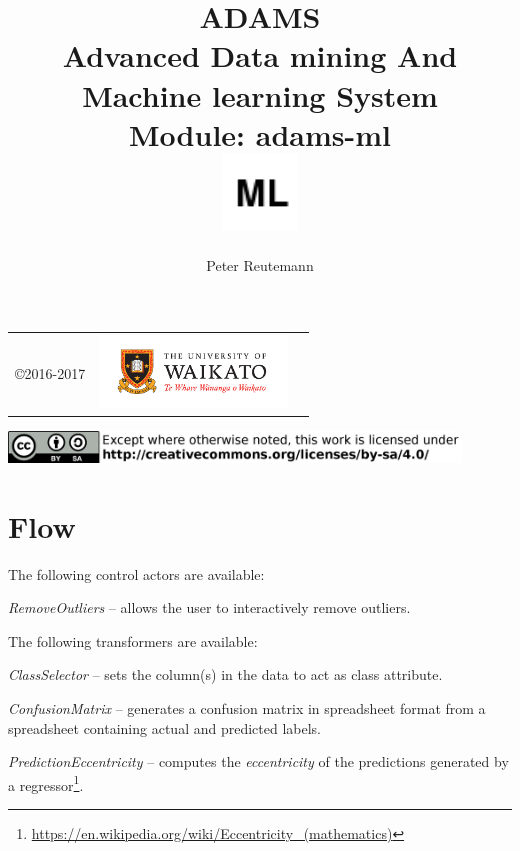 \documentclass[a4paper]{book}
\title{
  \textbf{ADAMS} \\
  {\Large \textbf{A}dvanced \textbf{D}ata mining \textbf{A}nd \textbf{M}achine
  learning \textbf{S}ystem} \\
  {\Large Module: adams-ml} \\
  \vspace{1cm}
  \includegraphics[width=2cm]{images/ml-module.png} \\
}
\author{
  Peter Reutemann
}
\begin{document}
\begin{titlepage}
\maketitle

\thispagestyle{empty}
\center
\begin{table}[b]
	\begin{tabular}{c l l}
		\parbox[c][2cm]{2cm}{\copyright 2016-2017} &
		\parbox[c][2cm]{5cm}{\includegraphics[width=5cm]{images/coat_of_arms.pdf}}
	\end{tabular}
	\includegraphics[width=12cm]{images/cc.png} \\
\end{table}

\end{titlepage}

\tableofcontents

\chapter{Flow}

The following control actors are available:
\begin{tight_itemize}
  \item \textit{RemoveOutliers} -- allows the user to interactively remove
  outliers.
\end{tight_itemize}

The following transformers are available:
\begin{tight_itemize}
  \item \textit{ClassSelector} -- sets the column(s) in the data to act as
  class attribute.
  \item \textit{ConfusionMatrix} -- generates a confusion matrix in spreadsheet
  format from a spreadsheet containing actual and predicted labels.
  \item \textit{PredictionEccentricity} -- computes the \textit{eccentricity}
  of the predictions generated by a regressor\footnote{\url{https://en.wikipedia.org/wiki/Eccentricity_(mathematics)}{}}.
\end{tight_itemize}
\end{document}
